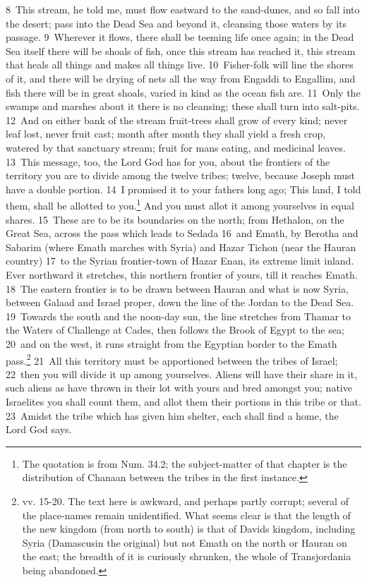 \documentclass[10pt]{book} %
\begin{document}
\textcolor{benred8}{8}~This stream, he told me, must flow eastward to the sand-dunes, and so fall into the desert; pass into the Dead Sea and beyond it, cleansing those waters by its passage. \textcolor{benred8}{9}~Wherever it flows, there shall be teeming life once again; in the Dead Sea itself there will be shoals of fish, once this stream has reached it, this stream that heals all things and makes all things live. \textcolor{benred8}{10}~Fisher-folk will line the shores of it, and there will be drying of nets all the way from Engaddi to Engallim, and fish there will be in great shoals, varied in kind as the ocean fish are. \textcolor{benred8}{11}~Only the swamps and marshes about it there is no cleansing; these shall turn into salt-pits. \textcolor{benred8}{12}~And on either bank of the stream fruit-trees shall grow of every kind; never leaf lost, never fruit cast; month after month they shall yield a fresh crop, watered by that sanctuary stream; fruit for man\textquotesingle s eating, and medicinal leaves.
\textcolor{benred8}{13}~This message, too, the Lord God has for you, about the frontiers of the territory you are to divide among the twelve tribes; twelve, because Joseph must have a double portion. \textcolor{benred8}{14}~I promised it to your fathers long ago; This land, I told them, shall be allotted to you.\footnote[1]{The quotation is from Num. 34.2; the subject-matter of that chapter is the distribution of Chanaan between the tribes in the first instance.} And you must allot it among yourselves in equal shares. \textcolor{benred8}{15}~These are to be its boundaries on the north; from Hethalon, on the Great Sea, across the pass which leads to Sedada \textcolor{benred8}{16}~and Emath, by Berotha and Sabarim (where Emath marches with Syria) and Hazar Tichon (near the Hauran country) \textcolor{benred8}{17}~to the Syrian frontier-town of Hazar Enan, its extreme limit inland. Ever northward it stretches, this northern frontier of yours, till it reaches Emath. \textcolor{benred8}{18}~The eastern frontier is to be drawn between Hauran and what is now Syria, between Galaad and Israel proper, down the line of the Jordan to the Dead Sea. \textcolor{benred8}{19}~Towards the south and the noon-day sun, the line stretches from Thamar to the Waters of Challenge at Cades, then follows the Brook of Egypt to the sea; \textcolor{benred8}{20}~and on the west, it runs straight from the Egyptian border to the Emath pass.\footnote[2]{vv. 15-20. The text here is awkward, and perhaps partly corrupt; several of the place-names remain unidentified. What seems clear is that the length of the new kingdom (from north to south) is that of David\textquotesingle s kingdom, including Syria (\textasciigrave Damascus\textquotesingle  in the original) but not Emath on the north or Hauran on the east; the breadth of it is curiously shrunken, the whole of Transjordania being abandoned.} \textcolor{benred8}{21}~All this territory must be apportioned between the tribes of Israel; \textcolor{benred8}{22}~then you will divide it up among yourselves. Aliens will have their share in it, such aliens as have thrown in their lot with yours and bred amongst you; native Israelites you shall count them, and allot them their portions in this tribe or that. \textcolor{benred8}{23}~Amidst the tribe which has given him shelter, each shall find a home, the Lord God says.
\end{document}

